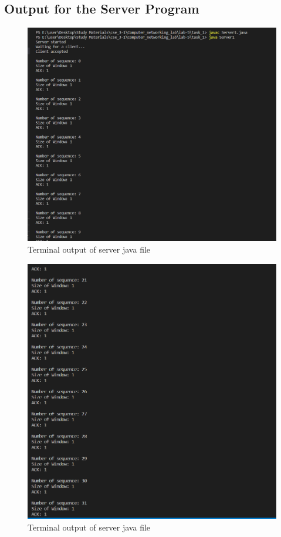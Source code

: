 \documentclass[11pt]{article}
\begin{document}
\subsection{Output for the Server Program}

 \begin{figure}[!h]
\centering
\includegraphics[width=\textwidth]{f_server1.png}
\caption{Terminal output of server java file }
\end{figure}
\FloatBarrier

\begin{figure}[!h]
\centering
\includegraphics[width=\textwidth]{f_server2.png}
\caption{Terminal output of server java file }
\end{figure}
\FloatBarrier
\end{document}
